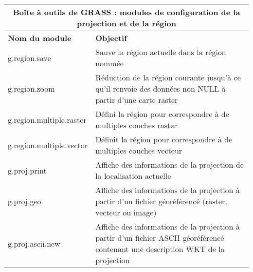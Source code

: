 \begin{table}[H]
\centering
 \begin{tabular}{|p{4cm}|p{10cm}|}
  \hline \multicolumn{2}{|c|}{\textbf{Boîte à outils de GRASS : modules de configuration de la projection et de la région}} \\
  \hline \textbf{Nom du module} & \textbf{Objectif} \\
\hline g.region.save & Sauve la région actuelle dans la région nommée \\
  \hline g.region.zoom & Réduction de la région courante jusqu'à ce qu'il renvoie des données non-NULL à partir d'une carte raster \\
  \hline g.region.multiple.raster & Défini la région pour correspondre à de multiples couches raster \\
  \hline g.region.multiple.vector & Définit la région pour correspondre à de multiples couches vecteur \\
  \hline g.proj.print & Affiche des informations de la projection de la localisation actuelle \\
  \hline g.proj.geo & Affiche des informations de la projection à partir d'un fichier géoréférencé (raster, vecteur ou image)\\
  \hline g.proj.ascii.new & Affiche des informations de la projection à partir d'un fichier ASCII géoréférencé contenant une description WKT de la projection\\

\end{tabular}
\end{table}

